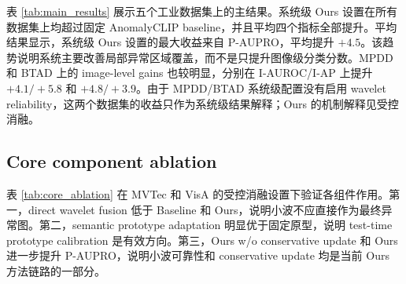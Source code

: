 \documentclass[10pt,a4paper,fontset=none]{ctexart}
\begin{document}
表 \ref{tab:main_results} 展示五个工业数据集上的主结果。系统级 Ours 设置在所有数据集上均超过固定 AnomalyCLIP baseline，并且平均四个指标全部提升。平均结果显示，系统级 Ours 设置的最大收益来自 P-AUPRO，平均提升 $+4.5$。该趋势说明系统主要改善局部异常区域覆盖，而不是只提升图像级分类分数。MPDD 和 BTAD 上的 image-level gains 也较明显，分别在 I-AUROC/I-AP 上提升 $+4.1/+5.8$ 和 $+4.8/+3.9$。由于 MPDD/BTAD 系统级配置没有启用 wavelet reliability，这两个数据集的收益只作为系统级结果解释；Ours 的机制解释见受控消融。

\subsection{Core component ablation}

\begin{table}[t]
\centering
\caption{Ours 核心组件消融。每个结果单元格为 P-AUROC / P-AUPRO / I-AUROC / I-AP。除 Baseline 外，各 prototype/fusion variants 使用相同 multi-crop 与 pixel-to-image 设置；因此因果解释应主要比较 variants 之间的相对变化。}
\label{tab:core_ablation}
\end{table}

表 \ref{tab:core_ablation} 在 MVTec 和 VisA 的受控消融设置下验证各组件作用。第一，direct wavelet fusion 低于 Baseline 和 Ours，说明小波不应直接作为最终异常图。第二，semantic prototype adaptation 明显优于固定原型，说明 test-time prototype calibration 是有效方向。第三，Ours w/o conservative update 和 Ours 进一步提升 P-AUPRO，说明小波可靠性和 conservative update 均是当前 Ours 方法链路的一部分。
\end{document}
